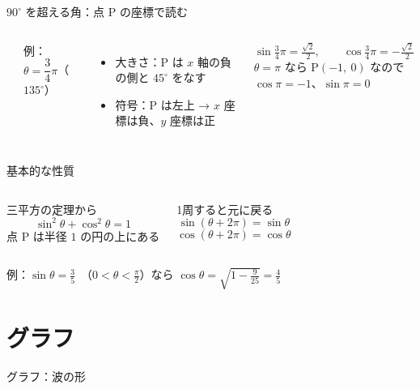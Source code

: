 \documentclass[aspectratio=169]{beamer}
\begin{document}
\begin{frame}{$90^\circ$ を超える角：点 P の座標で読む}
  \begin{columns}[c]
      \begin{center}
        
      \end{center}
      例：$\theta = \dfrac{3}{4}\pi$（$135^\circ$）
      \begin{itemize}
        \item 大きさ：P は $x$ 軸の負の側と $45^\circ$ をなす
        \item 符号：P は左上 → $x$ 座標は負、$y$ 座標は正
      \end{itemize}
      \[
        \sin\tfrac{3}{4}\pi = \tfrac{\sqrt{2}}{2}, \qquad
        \cos\tfrac{3}{4}\pi = -\tfrac{\sqrt{2}}{2}
      \]
      {\small $\theta = \pi$ なら P$(-1,\ 0)$ なので $\cos\pi = -1$、$\sin\pi = 0$}
  \end{columns}
\end{frame}

\begin{frame}{基本的な性質}
  \begin{columns}[t]
      \begin{block}{三平方の定理から}
        \[
          \sin^2\theta + \cos^2\theta = 1
        \]
        {\small 点 P は半径 $1$ の円の上にある}
      \end{block}
      \begin{block}{1周すると元に戻る}
        \[
          \sin(\theta + 2\pi) = \sin\theta
        \]
        \[
          \cos(\theta + 2\pi) = \cos\theta
        \]
      \end{block}
  \end{columns}
  \medskip
  例：$\sin\theta = \frac{3}{5}$\ （$0 < \theta < \frac{\pi}{2}$）なら
  $\cos\theta = \sqrt{1 - \frac{9}{25}} = \frac{4}{5}$
\end{frame}

\section{グラフ}

\begin{frame}{グラフ：波の形}
  \begin{center}
    
  \end{center}
\end{frame}
\end{document}
